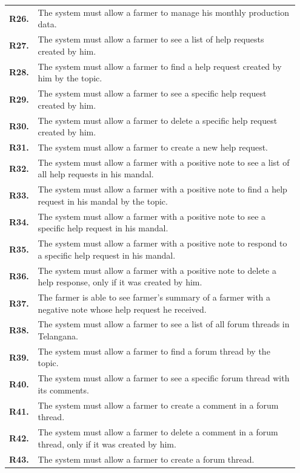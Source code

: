 \begin{longtable}{p{0.07\linewidth} p{0.88\linewidth}}
	\textbf{R26.} & The system must allow a farmer to manage his monthly production data.\\
	\textbf{R27.} & The system must allow a farmer to see a list of help requests created by him.\\
	\textbf{R28.} & The system must allow a farmer to find a help request created by him by the topic.\\
	\textbf{R29.} & The system must allow a farmer to see a specific help request created by him.\\
	\textbf{R30.} & The system must allow a farmer to delete a specific help request created by him.\\
	\textbf{R31.} & The system must allow a farmer to create a new help request.\\
	\textbf{R32.} & The system must allow a farmer with a positive note to see a list of all help requests in his mandal.\\
	\textbf{R33.} & The system must allow a farmer with a positive note to find a help request in his mandal by the topic.\\
	\textbf{R34.} & The system must allow a farmer with a positive note to see a specific help request in his mandal.\\
	\textbf{R35.} & The system must allow a farmer with a positive note to respond to a specific help request in his mandal.\\
	\textbf{R36.} & The system must allow a farmer with a positive note to delete a help response, only if it was created by him.\\
	\textbf{R37.} & The farmer is able to see farmer's summary of a farmer with a negative note whose help request he received. \\
	\textbf{R38.} & The system must allow a farmer to see a list of all forum threads in Telangana.\\
	\textbf{R39.} & The system must allow a farmer to find a forum thread by the topic.\\
	\textbf{R40.} & The system must allow a farmer to see a specific forum thread with its comments.\\
	\textbf{R41.} & The system must allow a farmer to create a comment in a forum thread.\\
	\textbf{R42.} & The system must allow a farmer to delete a comment in a forum thread, only if it was created by him.\\
	\textbf{R43.} & The system must allow a farmer to create a forum thread.\\
	

\end{longtable}
